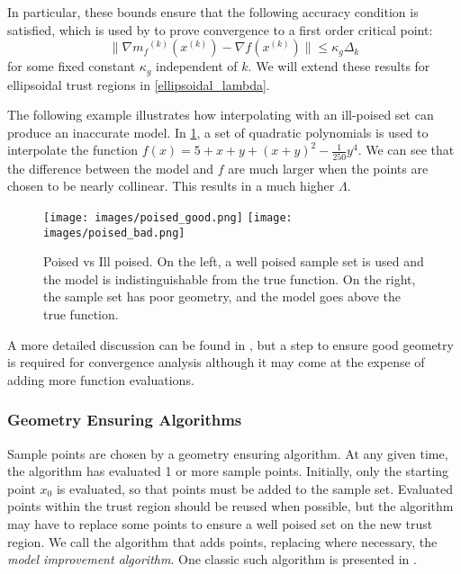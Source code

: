 \documentclass{article}
\theoremstyle{case}
\newcommand{\modelk}{{{m}_f}^{(k)}}
\newcommand{\iteratek}{{x}^{(k)}}
\begin{document}
In particular, these bounds ensure that the following accuracy condition is satisfied, which is used by \cite{Conejo:2013:GCT:2620806.2621814} to prove convergence to a first order critical point: 
\begin{equation}
\label{accuracy}
\|\nabla \modelk(\iteratek) - \nabla f(\iteratek) \| \le \kappa_g \Delta_k
\end{equation}
 for some fixed constant $\kappa_g$ independent of $k$.
We will extend these results for ellipsoidal trust regions in \cref{ellipsoidal_lambda}.
 

The following example illustrates how interpolating with an ill-poised set can produce an inaccurate model.
In \cref{pvip}, a set of quadratic polynomials is used to interpolate the function $f(x) = 5 + x + y + (x + y) ^ 2 - \frac 1 {250} y ^ 4$.
We can see that the difference between the model and $f$ are much larger when the points are chosen to be nearly collinear.
This results in a much higher $\Lambda$.

\begin{figure}[h]
    \centering
    \texttt{[image: images/poised\_good.png]}
    \texttt{[image: images/poised\_bad.png]}
    \caption{
		Poised vs Ill poised.
		On the left, a well poised sample set is used and the model is indistinguishable from the true function.
		On the right, the sample set has poor geometry, and the model goes above the true function.
	}
    \label{pvip}
\end{figure}


A more detailed discussion can be found in \cite{doi:10.1080/10556780802409296}, but a step to ensure good geometry is required for convergence analysis although it may come at the expense of adding more function evaluations.

\subsubsection{Geometry Ensuring Algorithms}

Sample points are chosen by a geometry ensuring algorithm.
At any given time, the algorithm has evaluated 1 or more sample points.
Initially, only the starting point $x_0$ is evaluated, so that points must be added to the sample set.
Evaluated points within the trust region should be reused when possible, but the algorithm may have to replace some points to ensure a well poised set on the new trust region.
We call the algorithm that adds points, replacing where necessary, the \emph{model improvement algorithm}.
One classic such algorithm is presented in \cite{DUMMY:intro_book}.
\end{document}
